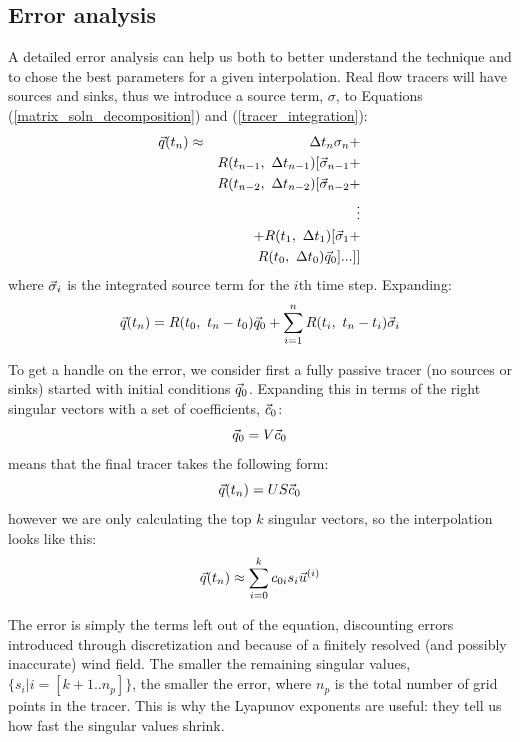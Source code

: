 \subsection{Error analysis}

A detailed error analysis can help us both to better understand the technique
and to chose the best parameters for a given interpolation.
Real flow tracers will have sources and sinks, thus we introduce a source
term, $\sigma$, to Equations (\ref{matrix_soln_decomposition})
and (\ref{tracer_integration}):
\begin{eqnarray}
	  \vec q(t_n) 
  & \approx & \Delta t_{n} \sigma_{n} + \nonumber \\
  & & R(t_{n-1}, ~ \Delta t_{n-1}) [\vec \sigma_{n-1} + \nonumber \\
  & & R(t_{n-2}, ~ \Delta t_{n-2}) [\vec \sigma_{n-2} + \nonumber \\
  & & \vdots \nonumber \\
  & & + R(t_1, ~ \Delta t_1) [\vec \sigma_1 + \nonumber \\
  & & R(t_0, ~ \Delta t_0) \vec q_0 ]...]]
\end{eqnarray}
where $\vec \sigma_i$ is the integrated source term for the $i$th time step.
Expanding:
\begin{equation}
\vec q(t_n) 
   = R(t_0,~t_n-t_0) \vec q_0 + \sum_{i=1}^{n} R(t_i,~t_n-t_i) \vec \sigma_i
  \label{sources_sinks}
\end{equation}

To get a handle on the error, we consider first a fully passive tracer 
(no sources or sinks) started with initial conditions $\vec q_0$.
Expanding this in terms of the right singular vectors with a set
of coefficients, $\vec c_0$:
\begin{equation}
	\vec q_0 = V \vec c_0
	\label{c0}
\end{equation}
means that the final tracer takes the following form:
\begin{equation}
	\vec q(t_n) = U S \vec c_0
\end{equation}
however we are only calculating the top $k$ singular vectors, so the
interpolation looks like this:
\begin{equation}
	\vec q(t_n) \approx \sum_{i=0}^k c_{0i} s_i \vec u^{(i)}
\end{equation}

The error is simply the terms left out of the equation,
discounting errors introduced through discretization and because of
a finitely resolved (and possibly inaccurate) wind field.
The smaller the remaining singular values, $\lbrace s_i|i=[k+1..n_p]\rbrace$,
the smaller the error, where $n_p$ is the total number of grid points in the tracer.
This is why the Lyapunov exponents are useful:
they tell us how fast the singular values shrink.

